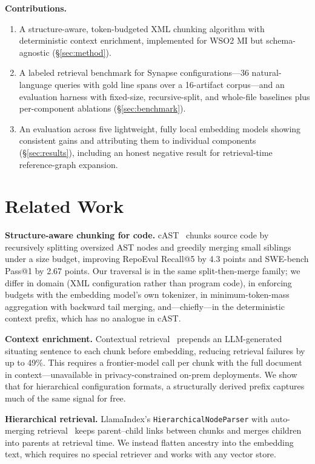 \documentclass[conference]{IEEEtran}
\begin{document}
\textbf{Contributions.}
\begin{enumerate}
  \item A structure-aware, token-budgeted XML chunking algorithm with deterministic context enrichment, implemented for WSO2 MI but schema-agnostic (\S\ref{sec:method}).
  \item A labeled retrieval benchmark for Synapse configurations---36 natural-language queries with gold line spans over a 16-artifact corpus---and an evaluation harness with fixed-size, recursive-split, and whole-file baselines plus per-component ablations (\S\ref{sec:benchmark}).
  \item An evaluation across five lightweight, fully local embedding models showing consistent gains and attributing them to individual components (\S\ref{sec:results}), including an honest negative result for retrieval-time reference-graph expansion.
\end{enumerate}

\section{Related Work}
\textbf{Structure-aware chunking for code.} cAST~\cite{zhang2025cast} chunks source code by recursively splitting oversized AST nodes and greedily merging small siblings under a size budget, improving RepoEval Recall@5 by 4.3 points and SWE-bench Pass@1 by 2.67 points. Our traversal is in the same split-then-merge family; we differ in domain (XML configuration rather than program code), in enforcing budgets with the embedding model's own tokenizer, in minimum-token-mass aggregation with backward tail merging, and---chiefly---in the deterministic context prefix, which has no analogue in cAST.

\textbf{Context enrichment.} Contextual retrieval~\cite{anthropic2024contextual} prepends an LLM-generated situating sentence to each chunk before embedding, reducing retrieval failures by up to 49\%. This requires a frontier-model call per chunk with the full document in context---unavailable in privacy-constrained on-prem deployments. We show that for hierarchical configuration formats, a structurally derived prefix captures much of the same signal for free.

\textbf{Hierarchical retrieval.} LlamaIndex's \texttt{HierarchicalNodeParser} with auto-merging retrieval~\cite{llamaindex} keeps parent--child links between chunks and merges children into parents at retrieval time. We instead flatten ancestry into the embedding text, which requires no special retriever and works with any vector store.
\end{document}
